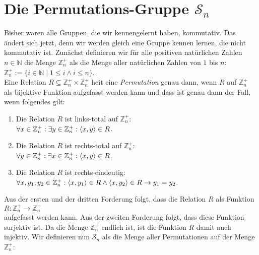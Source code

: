 \section{Die Permutations-Gruppe $\mathcal{S}_n$}
Bisher waren alle Gruppen, die wir kennengelernt haben, kommutativ.  Das \"{a}ndert sich jetzt, denn wir
werden gleich eine Gruppe kennen lernen, die nicht kommutativ ist.  Zun\"{a}chst definieren wir f\"{u}r alle
positiven nat\"{u}rlichen Zahlen $n \in \mathbb{N}$ die Menge $\mathbb{Z}_n^+$ als die Menge aller nat\"{u}rlichen Zahlen
von $1$ bis $n$:
\\[0.2cm]
\hspace*{1.3cm}
$\mathbb{Z}_n^+ := \{ i \in \mathbb{N} \mid 1 \leq i \wedge i \leq n \}$.
\\[0.2cm]
Eine Relation $R \subseteq \mathbb{Z}_n^+ \times \mathbb{Z}_n^+$ hei\3t eine \emph{Permutation} genau dann, wenn $R$ auf $\mathbb{Z}_n^+$
als bijektive Funktion aufgefasst werden kann und dass ist genau dann der Fall, wenn folgendes gilt:
\begin{enumerate}
\item Die Relation $R$ ist links-total auf $\mathbb{Z}_n^+$:
      \\[0.2cm]
      \hspace*{1.3cm}
      $\forall x \in \mathbb{Z}_n^+: \exists y \in \mathbb{Z}_n^+: \pair(x,y) \in R$.
\item Die Relation $R$ ist rechts-total auf $\mathbb{Z}_n^+$:
      \\[0.2cm]
      \hspace*{1.3cm}
      $\forall y \in \mathbb{Z}_n^+: \exists x \in \mathbb{Z}_n^+: \pair(x,y) \in R$.
\item Die Relation $R$ ist rechts-eindeutig:
      \\[0.2cm]
      \hspace*{1.3cm}
      $\forall x, y_1, y_2 \in \mathbb{Z}_n^+: \pair(x,y_1) \in R \wedge \pair(x,y_2) \in R \rightarrow y_1 = y_2$.
\end{enumerate}
Aus der ersten und der dritten Forderung folgt, dass die Relation $R$ als Funktion
\\[0.2cm]
\hspace*{1.3cm} $R : \mathbb{Z}_n^+ \rightarrow \mathbb{Z}_n^+$
\\[0.2cm]
aufgefasst werden kann.  Aus der zweiten Forderung folgt, dass diese Funktion surjektiv ist.  Da die
Menge $\mathbb{Z}_n^+$ endlich ist, ist die Funktion $R$ damit auch injektiv.
Wir definieren nun $\mathcal{S}_n$ als die Menge aller
Permutationen auf der Menge $\mathbb{Z}_n^+$:
